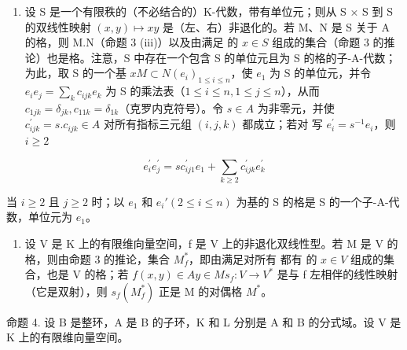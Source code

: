 \begin{enumerate}
\def\labelenumi{(\arabic{enumi})}
\setcounter{enumi}{3}
\tightlist
\item
  设 S 是一个有限秩的（不必结合的）K-代数，带有单位元；则从 S × S 到 S 的双线性映射 \((x,y)\mapsto xy\) 是（左、右）非退化的。若 M、N 是 S 关于 A 的格，则 M.N（命题 3 (iii)）以及由满足  的 \(x\in S\) 组成的集合（命题 3 的推论）也是格。注意，S 中存在一个包含 S 的单位元且为 S 的格的子-A-代数；为此，取 S 的一个基 \(xM\subset N\)\((e_{i})_{1\leqslant i\leqslant n}\)，使 \(e_{1}\) 为 S 的单位元，并令 \(e_{i}e_{j}=\sum_{k}c_{ijk}e_{k}\) 为 S 的乘法表（\(1\leqslant i\leqslant n,1\leqslant j\leqslant n\)），从而 \(c_{1jk}=\delta_{jk},c_{11k}=\delta_{1k}\)（克罗内克符号）。令 \(s\in A\) 为非零元，并使 \(c_{ijk}^{\prime}=s.c_{ijk}\in A\) 对所有指标三元组 \((i,j,k)\) 都成立；若对  写 \(e_{i}^{\prime}=s^{-1}e_{i}\)，则\(i\geqslant2\)
\end{enumerate}

\[
e _ {i} ^ {\prime} e _ {j} ^ {\prime} = s c _ {i j 1} ^ {\prime} e _ {1} + \sum_ {k \geqslant 2} c _ {i j k} ^ {\prime} e _ {k} ^ {\prime}
\]

当 \(i \geqslant 2\) 且 \(j \geqslant 2\) 时；以 \(e_1\) 和 \(e_i' (2 \leqslant i \leqslant n)\) 为基的 S 的格是 S 的一个子-A-代数，单位元为 \(e_1\)。

\begin{enumerate}
\def\labelenumi{(\arabic{enumi})}
\setcounter{enumi}{4}
\tightlist
\item
  设 V 是 K 上的有限维向量空间，f 是 V 上的非退化双线性型。若 M 是 V 的格，则由命题 3 的推论，集合 \(M_{f}^{*}\)，即由满足对所有  都有  的 \(x \in V\) 组成的集合，也是 V 的格；若 \(f(x, y) \in A\)\(y \in M\)\(s_{f}: V \to V^{*}\) 是与 f 左相伴的线性映射（它是双射），则 \(s_{f}(M_{f}^{*})\) 正是 M 的对偶格 \(M^{*}\)。
\end{enumerate}

命题 4. 设 B 是整环，A 是 B 的子环，K 和 L 分别是 A 和 B 的分式域。设 V 是 K 上的有限维向量空间。

